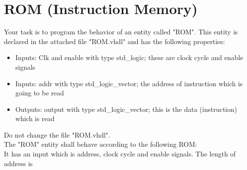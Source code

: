 \documentclass[a4paper,12pt]{article}
\begin{document}
\pagestyle{empty}
\setlength{\parindent}{0em} 
\section*{ROM (Instruction Memory)}


Your task is to program the behavior of an entity called "ROM". This entity is declared in the attached file "ROM.vhdl" and has the following properties:
\begin{itemize}
\item Inputs: Clk and enable with type std\_logic; these are clock cycle and enable signals
\item Inputs: addr with type std\_logic\_vector; the address of instruction which is going to be read
\item Outputs: output with type std\_logic\_vector; this is the data (instruction) which is read 
\end{itemize}
\vspace{0.3cm}
\begin{center}
\end{center}

Do not change the file "ROM.vhdl".\\

The "ROM" entity shall behave according to the following ROM:\\

It has an input which is address, clock cycle and enable signals. The length of address is %
\end{document}

